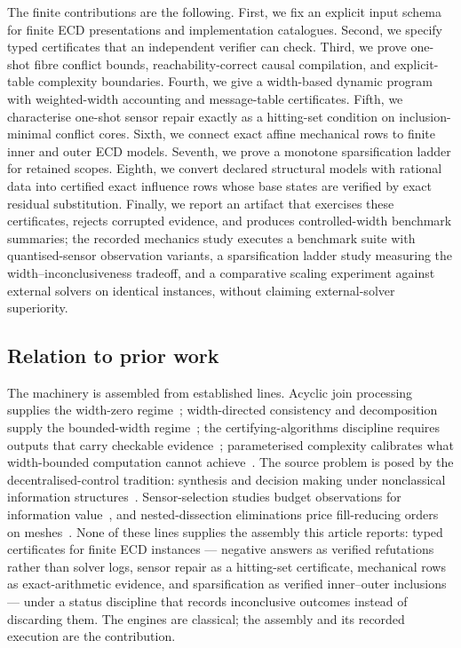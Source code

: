 \documentclass[11pt]{article}
\theoremstyle{plain}
\theoremstyle{definition}
\theoremstyle{remark}
\begin{document}
The finite contributions are the following.  First, we fix an explicit input
schema for finite ECD presentations and implementation catalogues.  Second, we
specify typed certificates that an independent verifier can check.  Third, we
prove one-shot fibre conflict bounds, reachability-correct causal compilation,
and explicit-table complexity boundaries.  Fourth, we give a width-based dynamic
program with weighted-width accounting and message-table certificates.  Fifth,
we characterise one-shot sensor repair exactly as a hitting-set condition on
inclusion-minimal conflict cores.  Sixth, we connect exact affine mechanical
rows to finite inner and outer ECD models.  Seventh, we prove a monotone
sparsification ladder for retained scopes.  Eighth, we convert declared
structural models with rational data into certified exact influence rows whose
base states are verified by exact residual substitution.
Finally, we report an artifact that exercises these certificates, rejects
corrupted evidence, and produces controlled-width benchmark summaries; the
recorded mechanics study executes a benchmark suite with quantised-sensor
observation variants, a sparsification ladder study measuring the
width--inconclusiveness tradeoff, and a comparative scaling experiment against
external solvers on identical instances, without claiming external-solver
superiority.

\subsection*{Relation to prior work}

The machinery is assembled from established lines.  Acyclic join processing
supplies the width-zero regime~\cite{yannakakis81}; width-directed consistency
and decomposition supply the bounded-width
regime~\cite{freuder82,dechter03,bodlaender-koster08}; the
certifying-algorithms discipline requires outputs that carry checkable
evidence~\cite{mcm11}; parameterised complexity calibrates what width-bounded
computation cannot achieve~\cite{downey-fellows99,impagliazzo-paturi01}.
The source problem is posed by the decentralised-control tradition: synthesis
and decision making under nonclassical information
structures~\cite{witsenhausen71,papadimitrioutsitsiklis86,bernstein02}.
Sensor-selection studies budget observations for information
value~\cite{krauseguestrin07}, and nested-dissection eliminations price
fill-reducing orders on meshes~\cite{george73,liptontarjan79}.  None of these
lines supplies the assembly this article reports: typed certificates for
finite ECD instances --- negative answers as verified refutations rather than
solver logs, sensor repair as a hitting-set certificate, mechanical rows as
exact-arithmetic evidence, and sparsification as verified inner--outer
inclusions --- under a status discipline that records inconclusive outcomes
instead of discarding them.  The engines are classical; the assembly and its
recorded execution are the contribution.
\end{document}
